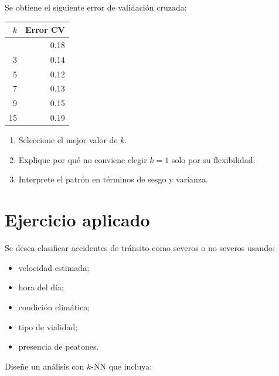 \documentclass[
  spanish,
  10.5pt,
  letterpaper,
  DIV=11,
  numbers=noendperiod,
  oneside,
  open=any]{scrreprt}
\newcounter{none} %
\providecommand{\tightlist}{%
  \setlength{\itemsep}{0pt}\setlength{\parskip}{0pt}}
\theoremstyle{definition}
\theoremstyle{definition}
\theoremstyle{plain}
\theoremstyle{remark}
\begin{document}

Se obtiene el siguiente error de validación cruzada:

{\def\LTcaptype{none} %
\begin{longtable}[]{@{}rr@{}}
\toprule\noalign{}
\(k\) & Error CV \\
\midrule\noalign{}
\endhead
\bottomrule\noalign{}
\endlastfoot
1 & 0.18 \\
3 & 0.14 \\
5 & 0.12 \\
7 & 0.13 \\
9 & 0.15 \\
15 & 0.19 \\
\end{longtable}
}

\begin{enumerate}
\def\labelenumi{\arabic{enumi}.}
\tightlist
\item
  Seleccione el mejor valor de \(k\).
\item
  Explique por qué no conviene elegir \(k=1\) solo por su flexibilidad.
\item
  Interprete el patrón en términos de sesgo y varianza.
\end{enumerate}

\section*{Ejercicio aplicado}\label{ejercicio-aplicado-8}


Se desea clasificar accidentes de tránsito como severos o no severos
usando:

\begin{itemize}
\tightlist
\item
  velocidad estimada;
\item
  hora del día;
\item
  condición climática;
\item
  tipo de vialidad;
\item
  presencia de peatones.
\end{itemize}

Diseñe un análisis con \(k\)-NN que incluya:
\end{document}
